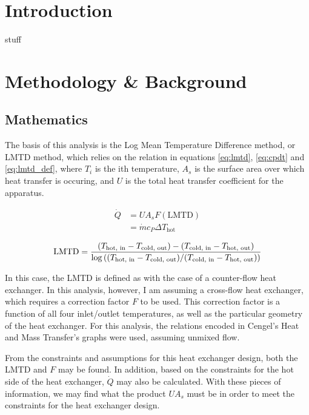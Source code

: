 \documentclass[12pt,letterpaper]{article}
\begin{document}
\sffamily

\section{Introduction}

stuff

\section{Methodology \& Background}

\subsection{Mathematics}

The basis of this analysis is the Log Mean Temperature Difference method, or LMTD method, which relies on the relation in equations \ref{eq:lmtd}, \ref{eq:cpdt} and \ref{eq:lmtd_def}, where \(T_i\) is the ith temperature, \(A_s\) is the surface area over which heat transfer is occuring, and \(U\) is the total heat transfer coefficient for the apparatus.

\begin{align}
\label{eq:lmtd}
\dot{Q} &= UA_s F(\textrm{LMTD})\\
\label{eq:cpdt}
        &= \dot{m}c_P \Delta T_{\textrm{hot}}
\end{align}

\begin{equation}
\label{eq:lmtd_def}
\textrm{LMTD} = 
\frac{ (T_{\textrm{hot, in}} - T_{\textrm{cold, out}} ) -
       (T_{\textrm{cold, in}} - T_{\textrm{hot, out}})
     }{
\log\left( 
    (T_{\textrm{hot, in}} - T_{\textrm{cold, out}} )
    \middle/ 
    (T_{\textrm{cold, in}} - T_{\textrm{hot, out}}) 
    \right) }
\end{equation}

In this case, the LMTD is defined as with the case of a counter-flow heat exchanger.  In this analysis, however, I am assuming a cross-flow heat exchanger, which requires a correction factor \(F\) to be used. This correction factor is a function of all four inlet/outlet temperatures, as well as the particular geometry of the heat exchanger.  For this analysis, the relations encoded in Cengel's Heat and Mass Transfer's graphs were used, assuming unmixed flow. 

From the constraints and assumptions for this heat exchanger design, both the LMTD and \(F\) may be found.  In addition, based on the constraints for the hot side of the heat exchanger, \(\dot{Q}\) may also be calculated. With these pieces of information, we may find what the product \(UA_s\) must be in order to meet the constraints for the heat exchanger design. 
\end{document}
